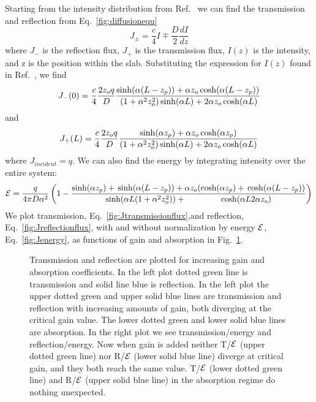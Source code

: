 Starting from the intensity distribution from Ref.~\cite{2004_Yamilov_intensity} we can find the transmission and reflection from Eq.~\ref{fig:diffusionequ}
\begin{equation}
J _{\pm} = \frac{c}{4} I \mp \frac{D}{2} \frac{dI}{dz}
\label{fig:diffusionequ}
\end{equation}
where $ J _- $ is the reflection flux, $ J _+ $ is the transmission flux, $I(z)$ is the intensity, and z is the position within the slab. Substituting the expression for $I(z)$ found in Ref.~\cite{diffusint}, we find
\begin{equation}
J _- (0) = \frac{c}{4} \frac{2 z _o q}{D} \\
\frac{\sinh(\alpha  (L-z _p)) + \alpha z_o \cosh(\alpha (L-z _p))}{\\
(1+ \alpha ^2 z_o ^2) \sinh(\alpha L) + 2 \alpha z_o \cosh(\alpha L)}
\label{fig:Jreflectionflux}
\end{equation}
and
\begin{equation}
J _+ (L) = \frac{c}{4} \frac{2 z _o q}{D} \\
\frac{\sinh(\alpha z_p) + \alpha z _o \cosh(\alpha z_p)}{(1+\alpha^2 z_o^2) \sinh(\alpha L) + 2 \alpha z_o \cosh(\alpha L)}
\label{fig:Jtransmissionflux}
\end{equation}
where $ J _{incident} = q $. We can also find the energy by integrating intensity over the entire system:
\begin{equation}
{\cal E} = \frac{q}{4 \pi D \alpha ^2} \left(1-\frac{\sinh(\alpha z_p) + \\
\sinh(\alpha (L-z_p))+\alpha z_o (\cosh(\alpha z_p) + \\
\cosh(\alpha (L - z_p))}{\sinh(\alpha L (1+\alpha^2 z_o^2))+\\
\cosh(\alpha L 2 \alpha z_o)}\right)
\label{fig:Jenergy}
\end{equation}
We plot transmission, Eq.~\ref{fig:Jtransmissionflux},and reflection, Eq.~\ref{fig:Jreflectionflux}, with and without normalization by energy ${\cal E}$, Eq.~\ref{fig:Jenergy}, as functions of gain and absorption in Fig.~\ref{fig:diffusiveRTRETE}.  
\begin{figure}
\vskip -0.5cm
\centerline{
}
\vskip -0.5cm
\caption{Transmission and reflection are plotted for increasing gain and absorption coefficients. In the left plot dotted green line is transmission and solid line blue is reflection. In the left plot the upper dotted green and upper solid blue lines are transmission and reflection with increasing amounts of gain, both diverging at the critical gain value. The lower dotted green and lower solid blue lines are absorption.  In the right plot we see transmission/energy and reflection/energy.  Now when gain is added neither T/${\cal E}$ (upper dotted green line) nor R/${\cal E}$ (lower solid blue line) diverge at critical gain, and they both reach the same value. T/${\cal E}$ (lower dotted green line) and R/${\cal E}$ (upper solid blue line) in the absorption regime do nothing unexpected.}
\label{fig:diffusiveRTRETE}
\end{figure}

